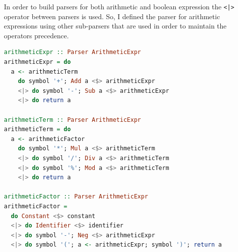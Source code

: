 \documentclass[12pt,a4paper]{article}
\begin{document}
In order to build parsers for both arithmetic and boolean expression the \texttt{<|>} operator between parsers is used.
So, I defined the parser for arithmetic expressions using other sub-parsers that are used in order to maintain the operators precedence.
\begin{lstlisting}[language=Haskell, style=custom-style]
arithmeticExpr :: Parser ArithmeticExpr
arithmeticExpr = do
  a <- arithmeticTerm
    do symbol '+'; Add a <$> arithmeticExpr
    <|> do symbol '-'; Sub a <$> arithmeticExpr
    <|> do return a

arithmeticTerm :: Parser ArithmeticExpr
arithmeticTerm = do
  a <- arithmeticFactor
    do symbol '*'; Mul a <$> arithmeticTerm
    <|> do symbol '/'; Div a <$> arithmeticTerm
    <|> do symbol '%'; Mod a <$> arithmeticTerm
    <|> do return a

arithmeticFactor :: Parser ArithmeticExpr
arithmeticFactor =
  do Constant <$> constant
  <|> do Identifier <$> identifier
  <|> do symbol '-'; Neg <$> arithmeticExpr
  <|> do symbol '('; a <- arithmeticExpr; symbol ')'; return a
\end{lstlisting}
\end{document}

